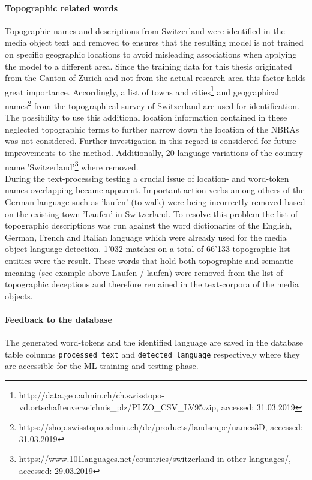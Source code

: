 \paragraph*{Topographic related words}
Topographic names and descriptions from Switzerland were identified in the media object text and removed to ensures that the resulting model is not trained on specific geographic locations to avoid misleading associations when applying the model to a different area. Since the training data for this thesis originated from the Canton of Zurich and not from the actual research area this factor holds great importance. Accordingly, a list of towns and cities\footnote{http://data.geo.admin.ch/ch.swisstopo-vd.ortschaftenverzeichnis\_plz/PLZO\_CSV\_LV95.zip, accessed: 31.03.2019} and geographical names\footnote{https://shop.swisstopo.admin.ch/de/products/landscape/names3D, accessed: 31.03.2019} from the topographical survey of Switzerland are used for identification. 
The possibility to use this additional location information contained in these neglected topographic terms to further narrow down the location of the NBRAs was not considered. Further investigation in this regard is considered for future improvements to the method. Additionally, 20 language variations of the country name 'Switzerland'\footnote{https://www.101languages.net/countries/switzerland-in-other-languages/, accessed: 29.03.2019} where removed. \\
During the text-processing testing a crucial issue of location- and word-token names overlapping became apparent. Important action verbs among others of the German language such as 'laufen' (to walk) were being incorrectly removed based on the existing town 'Laufen' in Switzerland. To resolve this problem the list of topographic descriptions was run against the word dictionaries of the English, German, French and Italian language which were already used for the media object language detection. 1'032 matches on a total of 66'133 topographic list entities were the result. These words that hold both topographic and semantic meaning (see example above Laufen / laufen) were removed from the list of topographic deceptions and therefore remained in the text-corpora of the media objects.

\paragraph*{Feedback to the database}
The generated word-tokens and the identified language are saved in the database table columns \texttt{processed\_text} and \texttt{detected\_language} respectively where they are accessible for the ML training and testing phase.

